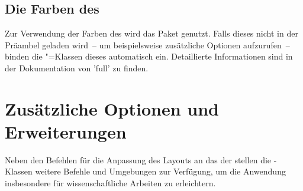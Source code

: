 \begin{Declaration*}{}
\begin{Declaration*}{}
\begin{Declaration*}{}
\subsection{Die Farben des \CDs}
%
%
Zur Verwendung der Farben des \CDs wird das Paket  
genutzt. Falls dieses nicht in der Präambel geladen wird~-- um beispielsweise 
zusätzliche Optionen aufzurufen~-- binden die \TUDScript"=Klassen dieses 
automatisch ein. Detaillierte Informationen sind in der Dokumentation von 
'full' zu finden.
%


\section{Zusätzliche Optionen und Erweiterungen}
%
Neben den Befehlen für die Anpassung des Layouts an das \CD der \TnUD stellen 
die \TUDScript-Klassen weitere Befehle und Umgebungen zur Verfügung, um die 
Anwendung insbesondere für wissenschaftliche Arbeiten zu erleichtern.



\end{Declaration*}
\end{Declaration*}
\end{Declaration*}
